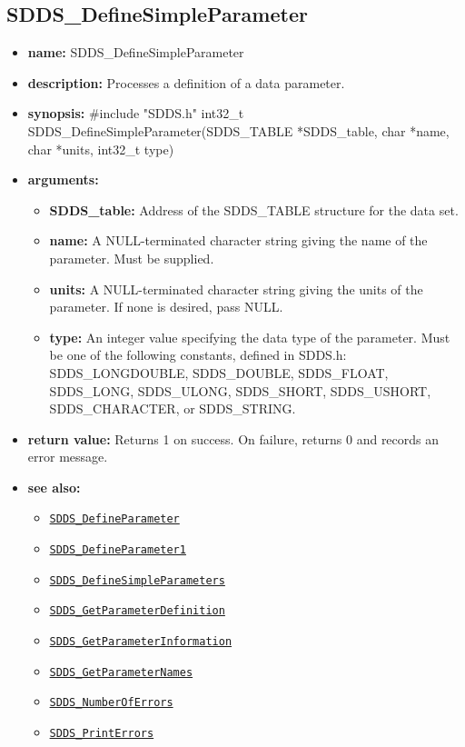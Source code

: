 \documentclass[11pt]{article}
\newcommand{\progref}[1]{\hyperref[SDDS_#1]{\tt SDDS\_#1}}
\begin{document}
\subsection{SDDS\_DefineSimpleParameter}
\label{SDDS_DefineSimpleParameter}

\begin{itemize}
\item {\bf name:}\newline
SDDS\_DefineSimpleParameter
\item {\bf description:}\newline
Processes a definition of a data parameter.
\item {\bf synopsis:} \#include "SDDS.h"\newline
int32\_t SDDS\_DefineSimpleParameter(SDDS\_TABLE *SDDS\_table, char *name, char *units, int32\_t type)
\item {\bf arguments:}
\begin{itemize}
\item {\bf SDDS\_table:} Address of the SDDS\_TABLE structure for the data set.
\item {\bf name:} A NULL-terminated character string giving the name of the parameter. Must be supplied.
\item {\bf units:} A NULL-terminated character string giving the units of the parameter. If none is desired, pass NULL.
\item {\bf type:} An integer value specifying the data type of the parameter. Must be one of the following constants, defined in  SDDS.h: SDDS\_LONGDOUBLE, SDDS\_DOUBLE, SDDS\_FLOAT, SDDS\_LONG, SDDS\_ULONG, SDDS\_SHORT, SDDS\_USHORT, SDDS\_CHARACTER, or SDDS\_STRING.
\end{itemize}
\item {\bf return value:}\newline
Returns 1 on success. On failure, returns 0 and records an error message.
\item {\bf see also:}
\begin{itemize}
\item \progref{DefineParameter}
\item \progref{DefineParameter1}
\item \progref{DefineSimpleParameters}
\item \progref{GetParameterDefinition}
\item \progref{GetParameterInformation}
\item \progref{GetParameterNames}
\item \progref{NumberOfErrors}
\item \progref{PrintErrors}
\end{itemize}
\end{itemize}
\end{document}
